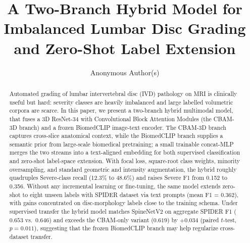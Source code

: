 \documentclass[runningheads]{llncs}
\begin{document}
%
\title{A Two-Branch Hybrid Model for Imbalanced Lumbar Disc Grading and Zero-Shot Label Extension}
%
%
%
\author{Anonymous Author(s)}
%
\maketitle
%
\begin{abstract}
Automated grading of lumbar intervertebral disc (IVD) pathology on MRI is clinically useful but hard: severity classes are heavily imbalanced and large labelled volumetric corpora are scarce. In this paper, we present a two-branch hybrid multimodal model, that fuses a 3D ResNet-34 with Convolutional Block Attention Modules (the CBAM-3D branch) and a frozen BiomedCLIP image-text encoder. The CBAM-3D branch captures cross-slice anatomical context, while the BiomedCLIP branch supplies a semantic prior from large-scale biomedical pretraining; a small trainable concat-MLP merges the two streams into a text-aligned embedding for both supervised classification and zero-shot label-space extension. With focal loss, square-root class weights, minority oversampling, and standard geometric and intensity augmentation, the hybrid roughly quadruples Severe-class recall (12.3\% to 48.6\%) and raises Severe F1 from 0.152 to 0.356. Without any incremental learning or fine-tuning, the same model extends zero-shot to eight unseen labels with SPIDER dataset via text prompts (mean F1 = 0.362), with gains concentrated on disc-morphology labels close to the training schema. Under supervised transfer the hybrid model matches SpineNetV2 on aggregate SPIDER F1 ($0.653$ vs.\ $0.646$) and exceeds the CBAM-only variant ($0.619$) by $+0.034$ (paired $t$-test, $p=0.011$), suggesting that the frozen BiomedCLIP branch may help regularize cross-dataset transfer.

\end{abstract}
%
\end{document}

